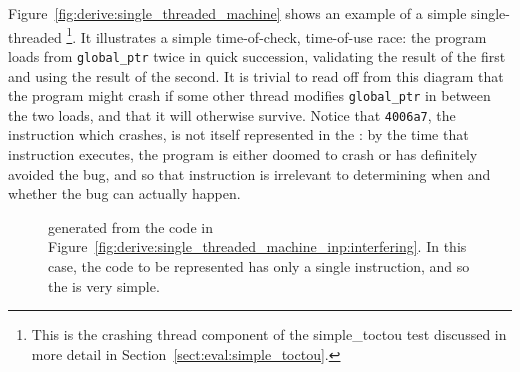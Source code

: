 Figure~\ref{fig:derive:single_threaded_machine} shows an example of a
simple single-threaded {\StateMachine}\footnote{This is the crashing
  thread component of the simple\_toctou test discussed in more detail
  in Section~\ref{sect:eval:simple_toctou}.}.  It illustrates a simple
time-of-check, time-of-use race: the program loads from
\verb|global_ptr| twice in quick succession, validating the result of
the first and using the result of the second.  It is trivial to read
off from this diagram that the program might crash if some other
thread modifies \verb|global_ptr| in between the two loads, and that
it will otherwise survive.  Notice that \verb|4006a7|, the instruction
which crashes, is not itself represented in the {\StateMachine}: by
the time that instruction executes, the program is either doomed to
crash or has definitely avoided the bug, and so that instruction is
irrelevant to determining when and whether the bug can actually
happen.

\begin{figure}
  \begin{center}
  \end{center}
  \caption{{\STateMachine} generated from the code in
    Figure~\ref{fig:derive:single_threaded_machine_inp:interfering}.
    In this case, the code to be represented has only a single
    instruction, and so the {\StateMachine} is very
    simple. }
  \label{fig:derive:single_threaded_machine_write}
\end{figure}

